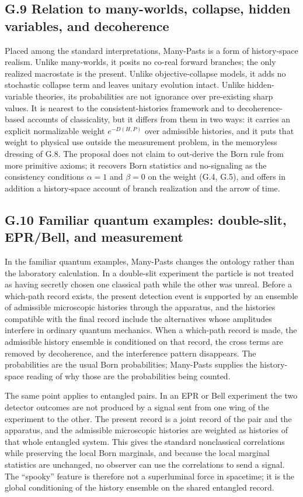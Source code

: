\documentclass[11pt]{article}
\begin{document}
\subsection*{G.9 Relation to many-worlds, collapse, hidden variables, and decoherence}

Placed among the standard interpretations, Many-Pasts is a form of history-space realism. Unlike many-worlds, it posits no co-real forward branches; the only realized macrostate is the present. Unlike objective-collapse models, it adds no stochastic collapse term and leaves unitary evolution intact. Unlike hidden-variable theories, its probabilities are not ignorance over pre-existing sharp values. It is nearest to the consistent-histories framework and to decoherence-based accounts of classicality, but it differs from them in two ways: it carries an explicit normalizable weight $e^{-D(H,P)}$ over admissible histories, and it puts that weight to physical use outside the measurement problem, in the memoryless dressing of G.8. The proposal does not claim to out-derive the Born rule from more primitive axioms; it recovers Born statistics and no-signaling as the consistency conditions $\alpha=1$ and $\beta=0$ on the weight (G.4, G.5), and offers in addition a history-space account of branch realization and the arrow of time.


\subsection*{G.10 Familiar quantum examples: double-slit, EPR/Bell, and measurement}

In the familiar quantum examples, Many-Pasts changes the ontology rather than the laboratory calculation. In a double-slit experiment the particle is not treated as having secretly chosen one classical path while the other was unreal. Before a which-path record exists, the present detection event is supported by an ensemble of admissible microscopic histories through the apparatus, and the histories compatible with the final record include the alternatives whose amplitudes interfere in ordinary quantum mechanics. When a which-path record is made, the admissible history ensemble is conditioned on that record, the cross terms are removed by decoherence, and the interference pattern disappears. The probabilities are the usual Born probabilities; Many-Pasts supplies the history-space reading of why those are the probabilities being counted.

The same point applies to entangled pairs. In an EPR or Bell experiment the two detector outcomes are not produced by a signal sent from one wing of the experiment to the other. The present record is a joint record of the pair and the apparatus, and the admissible microscopic histories are weighted as histories of that whole entangled system. This gives the standard nonclassical correlations while preserving the local Born marginals, and because the local marginal statistics are unchanged, no observer can use the correlations to send a signal. The ``spooky'' feature is therefore not a superluminal force in spacetime; it is the global conditioning of the history ensemble on the shared entangled record.
\end{document}

